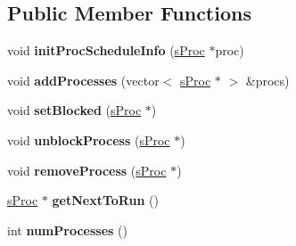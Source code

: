 \subsection*{\-Public \-Member \-Functions}
\begin{DoxyCompactItemize}
\item 
\hypertarget{classcRoundRobin_a10405a29851eefc296b1381d18a066fe}{void {\bfseries init\-Proc\-Schedule\-Info} (\hyperlink{structsProc}{s\-Proc} $\ast$proc)}\label{dc/dcc/classcRoundRobin_a10405a29851eefc296b1381d18a066fe}

\item 
\hypertarget{classcRoundRobin_ad95f6a0fcf1491204e97eb8251fd947e}{void {\bfseries add\-Processes} (vector$<$ \hyperlink{structsProc}{s\-Proc} $\ast$ $>$ \&procs)}\label{dc/dcc/classcRoundRobin_ad95f6a0fcf1491204e97eb8251fd947e}

\item 
\hypertarget{classcRoundRobin_a8a61733eb22f178f571e60c2f7733554}{void {\bfseries set\-Blocked} (\hyperlink{structsProc}{s\-Proc} $\ast$)}\label{dc/dcc/classcRoundRobin_a8a61733eb22f178f571e60c2f7733554}

\item 
\hypertarget{classcRoundRobin_ab404125f4c54dfe1a1b183378dadc0f7}{void {\bfseries unblock\-Process} (\hyperlink{structsProc}{s\-Proc} $\ast$)}\label{dc/dcc/classcRoundRobin_ab404125f4c54dfe1a1b183378dadc0f7}

\item 
\hypertarget{classcRoundRobin_aae2aeb468ef9da468025de256d989b49}{void {\bfseries remove\-Process} (\hyperlink{structsProc}{s\-Proc} $\ast$)}\label{dc/dcc/classcRoundRobin_aae2aeb468ef9da468025de256d989b49}

\item 
\hypertarget{classcRoundRobin_a2fd190aaa6fa83ee4e9cee65234d76da}{\hyperlink{structsProc}{s\-Proc} $\ast$ {\bfseries get\-Next\-To\-Run} ()}\label{dc/dcc/classcRoundRobin_a2fd190aaa6fa83ee4e9cee65234d76da}

\item 
\hypertarget{classcRoundRobin_a3b5eeb480739c6ca7f4a69b6d4069626}{int {\bfseries num\-Processes} ()}\label{dc/dcc/classcRoundRobin_a3b5eeb480739c6ca7f4a69b6d4069626}

\end{DoxyCompactItemize}
